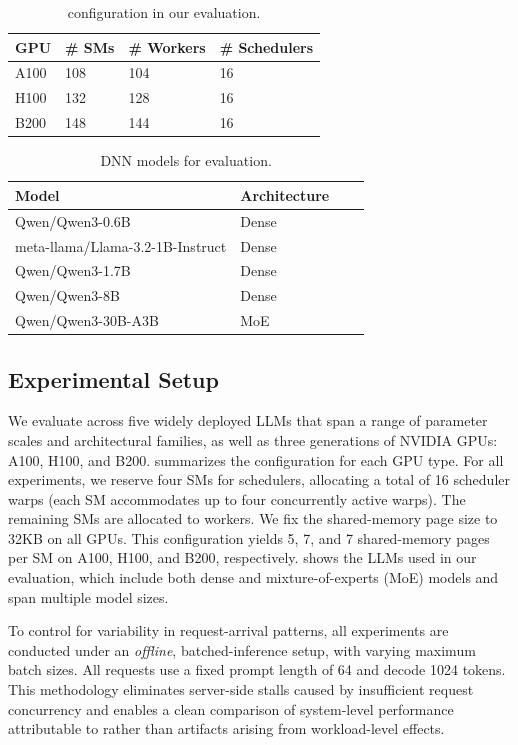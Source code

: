 \begin{table}
    \centering
    \caption{\sys configuration in our evaluation.}
    \label{tab:benchmarks}
    \begin{tabular}{l|lll}
    \toprule
    {\bf GPU} & {\bf \# SMs} & {\bf \# Workers} & {\bf \# Schedulers}\\
    \midrule
    A100 & 108 & 104 & 16 \\
    H100 & 132 & 128 & 16 \\
    B200 & 148 & 144 & 16 \\
    \bottomrule
    \end{tabular}
\end{table}

\begin{table}
\centering
    \caption{\sys DNN models for evaluation.}
     \label{tab:models}
    \begin{tabular}{l|lll}
    \toprule
    {\bf Model} & {\bf Architecture} \\
    \midrule
    Qwen/Qwen3-0.6B & Dense \\
    meta-llama/Llama-3.2-1B-Instruct & Dense \\
    Qwen/Qwen3-1.7B & Dense \\
    Qwen/Qwen3-8B & Dense \\
    Qwen/Qwen3-30B-A3B & MoE \\
    \bottomrule
    \end{tabular}
\end{table}
\fi 

\subsection{Experimental Setup}
We evaluate \sys across five widely deployed LLMs that span a range of parameter scales and architectural families, as well as three generations of NVIDIA GPUs: A100, H100, and B200.
 summarizes the \sys configuration for each GPU type. For all experiments, we reserve four SMs for schedulers, allocating a total of 16 scheduler warps (each SM accommodates up to four concurrently active warps). The remaining SMs are allocated to workers. We fix the shared-memory page size to 32KB on all GPUs. This configuration yields 5, 7, and 7 shared-memory pages per SM on A100, H100, and B200, respectively.
 shows the LLMs used in our evaluation, which include both dense and mixture-of-experts (MoE) models and span multiple model sizes.

To control for variability in request-arrival patterns, all experiments are conducted under an {\em offline}, batched-inference setup, with varying maximum batch sizes. All requests use a fixed prompt length of 64 and decode 1024 tokens. This methodology eliminates server-side stalls caused by insufficient request concurrency and enables a clean comparison of system-level performance attributable to \sys rather than artifacts arising from workload-level effects.

